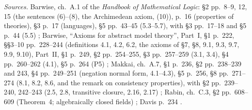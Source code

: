 \emph{Sources.}  Barwise, ch.~A.1 of the \emph{Handbook of Mathematical
Logic}: \S2 pp.~8--9, 12, 15 (the sentences (6)--(8), the Archimedean
axiom, (10)), p.~16 (properties of theories), \S3 p.~17 (languages), \S5
pp.~43--45 (5.3--5.7), with \S3 pp.~17--18 and \S5 p.~44 (5.5)
\cite{Barwise1977FirstOrder}; Barwise, ``Axioms for abstract model
theory'', Part~I, \S1 p.~222, \S\S3--10 pp.~228--244 (definitions 4.1, 4.2,
6.2, the axioms of \S7, \S8, 9.1, 9.3, 9.7, 9.9, 9.10), Part~II, \S1
p.~249, \S2 pp.~254--255, \S3 pp.~257--259 (3.1, 3.4), \S4 pp.~260--262
(4.1), \S5 p.~264 (P5) \cite{Barwise1974Axioms}; Makkai, ch.~A.7, \S1
p.~236, \S2 pp.~238--239 and 243, \S4 pp.~249--251 (negation normal form,
4.1--4.3), \S5 p.~256, \S8 pp.~271--274 (8.1, 8.2, 8.6, and the remark on
consistency properties), with \S2 pp.~239--240, 242--243 (2.5, 2.8,
transitive closure, 2.16, 2.17) \cite{Makkai1977}; Rabin, ch.~C.3, \S2
pp.~608--609 (Theorem~4; algebraically closed fields)
\cite{Rabin1977Decidable}; Davis p.~234 \cite{Davis1973}.
